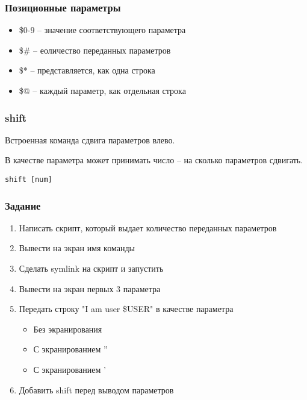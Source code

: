 
\begin{frame}
	\frametitle{Позиционные параметры}

	\begin{itemize}
		\item \$0-9 -- значение соответствующего параметра
		\item \$\# -- еоличество переданных параметров
		\item \$* -- представляется, как одна строка
		\item \$@ -- каждый параметр, как отдельная строка
	\end{itemize}

\end{frame}


\begin{frame}[fragile]
	\frametitle{shift}

	Встроенная команда сдвига параметров влево.

	В качестве параметра может принимать число -- на сколько параметров сдвигать.

	\begin{lstlisting}
shift [num]
	\end{lstlisting}

\end{frame}


\begin{frame}
	\frametitle{Задание}

	\begin{enumerate}
		\item Написать скрипт,  который выдает количество переданных параметров
			\pause
		\item Вывести на экран имя команды
			\pause
		\item Сделать symlink на скрипт и запустить
			\pause
		\item Вывести на экран первых 3 параметра
			\pause
		\item Передать строку "I am user \$USER" в качестве параметра
			\begin{itemize}
				\item Без экранирования
				\item С экранированием ''
				\item С экранированием '
			\end{itemize}
			\pause
		\item Добавить shift перед выводом параметров
	\end{enumerate}
\end{frame}



